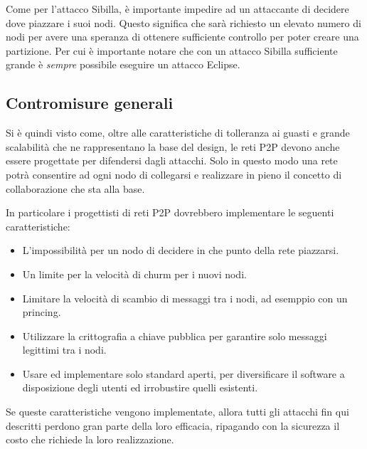Come per l'attacco Sibilla, è importante impedire ad un attaccante di
decidere dove piazzare i suoi nodi. Questo significa che sarà richiesto
un elevato numero di nodi per avere una speranza di ottenere sufficiente
controllo per poter creare una partizione. Per cui è importante notare
che con un attacco Sibilla sufficiente grande è \emph{sempre} possibile
eseguire un attacco Eclipse.

\subsection{Contromisure generali}\label{contromisure-generali}

Si è quindi visto come, oltre alle caratteristiche di tolleranza ai
guasti e grande scalabilità che ne rappresentano la base del design, le
reti P2P devono anche essere progettate per difendersi dagli attacchi.
Solo in questo modo una rete potrà consentire ad ogni nodo di collegarsi
e realizzare in pieno il concetto di collaborazione che sta alla base.

In particolare i progettisti di reti P2P dovrebbero implementare le
seguenti caratteristiche:

\begin{itemize}
\itemsep1pt\parskip0pt
\item
  L'impossibilità per un nodo di decidere in che punto della rete
  piazzarsi.
\item
  Un limite per la velocità di churm per i nuovi nodi.
\item
  Limitare la velocità di scambio di messaggi tra i nodi, ad esemppio
  con un princing.
\item
  Utilizzare la crittografia a chiave pubblica per garantire solo
  messaggi legittimi tra i nodi.
\item
  Usare ed implementare solo standard aperti, per diversificare il
  software a disposizione degli utenti ed irrobustire quelli esistenti.
\end{itemize}

Se queste caratteristiche vengono implementate, allora tutti gli
attacchi fin qui descritti perdono gran parte della loro efficacia,
ripagando con la sicurezza il costo che richiede la loro realizzazione.
